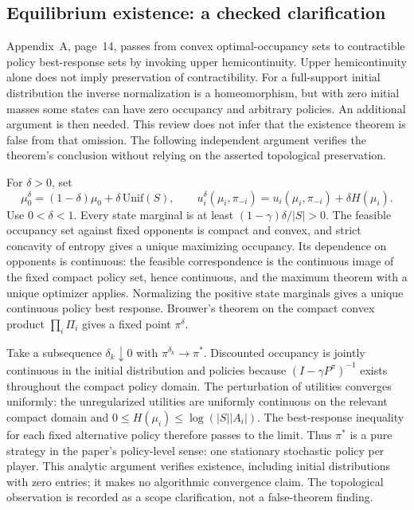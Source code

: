 \documentclass[10pt]{article}
\begin{document}
\subsection*{Equilibrium existence: a checked clarification}
Appendix A, page 14, passes from convex optimal-occupancy sets to contractible policy best-response sets by invoking upper hemicontinuity. Upper hemicontinuity alone does not imply preservation of contractibility. For a full-support initial distribution the inverse normalization is a homeomorphism, but with zero initial masses some states can have zero occupancy and arbitrary policies. An additional argument is then needed. This review does not infer that the existence theorem is false from that omission. The following independent argument verifies the theorem’s conclusion without relying on the asserted topological preservation.\par
For \(\delta>0\), set \[\mu_0^\delta=(1-\delta)\mu_0+\delta\,\mathrm{Unif}(S),
 \qquad
 u_i^\delta(\mu_i,\pi_{-i})=u_i(\mu_i,\pi_{-i})+\delta H(\mu_i).\] Use \(0<\delta<1\). Every state marginal is at least \((1-\gamma)\delta/|S|>0\). The feasible occupancy set against fixed opponents is compact and convex, and strict concavity of entropy gives a unique maximizing occupancy. Its dependence on opponents is continuous: the feasible correspondence is the continuous image of the fixed compact policy set, hence continuous, and the maximum theorem with a unique optimizer applies. Normalizing the positive state marginals gives a unique continuous policy best response. Brouwer’s theorem on the compact convex product \(\prod_i\Pi_i\) gives a fixed point \(\pi^\delta\).\par
Take a subsequence \(\delta_k\downarrow0\) with \(\pi^{\delta_k}\to\pi^*\). Discounted occupancy is jointly continuous in the initial distribution and policies because \((I-\gamma P^\pi)^{-1}\) exists throughout the compact policy domain. The perturbation of utilities converges uniformly: the unregularized utilities are uniformly continuous on the relevant compact domain and \(0\leq H(\mu_i)\leq\log(|S||A_i|)\). The best-response inequality for each fixed alternative policy therefore passes to the limit. Thus \(\pi^*\) is a pure strategy in the paper’s policy-level sense: one stationary stochastic policy per player. This analytic argument verifies existence, including initial distributions with zero entries; it makes no algorithmic convergence claim. The topological observation is recorded as a scope clarification, not a false-theorem finding.\par
\end{document}
